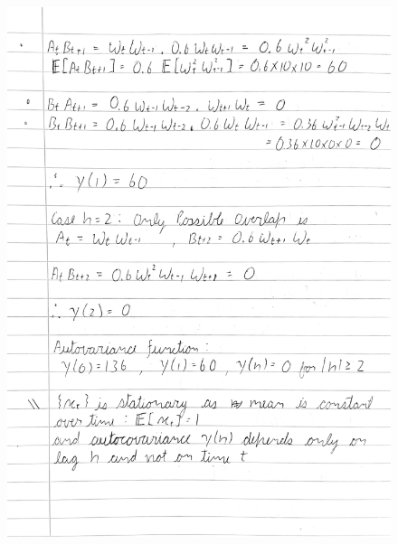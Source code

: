 \documentclass[a4paper,11pt]{article}
\begin{document}
    \begin{figure}[H]
        \centering
        \includegraphics[width=1\textwidth]{ha-1_files/1-2.png}
        \label{fig:1-2}
    \end{figure}
\end{document}
